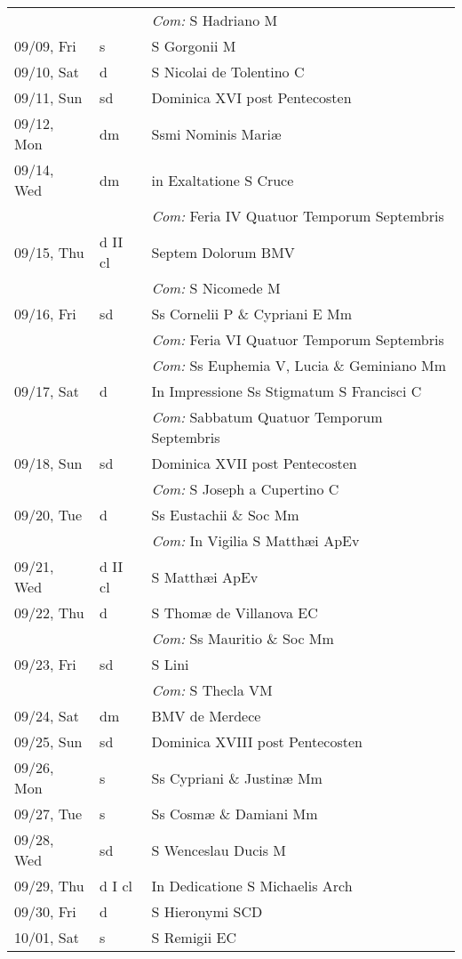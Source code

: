 \documentclass[10pt]{article}
\begin{document}
\begin{longtable}{ l l l }
 & & \textit{Com:} S Hadriano M\\
09/09, Fri & s & S Gorgonii M\\
09/10, Sat & d & S Nicolai de Tolentino C\\
09/11, Sun & sd & Dominica XVI post Pentecosten\\
09/12, Mon & dm & Ssmi Nominis Mariæ\\
09/14, Wed & dm & in Exaltatione S Cruce\\
 & & \textit{Com:} Feria IV Quatuor Temporum Septembris\\
09/15, Thu & d II cl & Septem Dolorum BMV\\
 & & \textit{Com:} S Nicomede M\\
09/16, Fri & sd & Ss Cornelii P \& Cypriani E Mm\\
 & & \textit{Com:} Feria VI Quatuor Temporum Septembris\\
 & & \textit{Com:} Ss Euphemia V, Lucia \& Geminiano Mm\\
09/17, Sat & d & In Impressione Ss Stigmatum S Francisci C\\
 & & \textit{Com:} Sabbatum Quatuor Temporum Septembris\\
09/18, Sun & sd & Dominica XVII post Pentecosten\\
 & & \textit{Com:} S Joseph a Cupertino C\\
09/20, Tue & d & Ss Eustachii \& Soc Mm\\
 & & \textit{Com:} In Vigilia S Matthæi ApEv\\
09/21, Wed & d II cl & S Matthæi ApEv\\
09/22, Thu & d & S Thomæ de Villanova EC\\
 & & \textit{Com:} Ss Mauritio \& Soc Mm\\
09/23, Fri & sd & S Lini\\
 & & \textit{Com:} S Thecla VM\\
09/24, Sat & dm & BMV de Merdece\\
09/25, Sun & sd & Dominica XVIII post Pentecosten\\
09/26, Mon & s & Ss Cypriani \& Justinæ Mm\\
09/27, Tue & s & Ss Cosmæ \& Damiani Mm\\
09/28, Wed & sd & S Wenceslau Ducis M\\
09/29, Thu & d I cl & In Dedicatione S Michaelis Arch\\
09/30, Fri & d & S Hieronymi SCD\\
10/01, Sat & s & S Remigii EC\\

\end{longtable}
\end{document}
